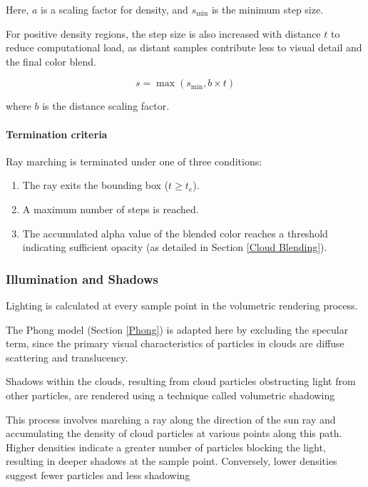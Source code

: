  Here, $a$ is a scaling factor for density, and $s_{\text{min}}$ is the minimum step size.

For positive density regions, the step size is also increased with distance $t$ to reduce computational load, as distant samples contribute less to visual detail and the final color blend.

\begin{equation}
     s = \max(s_{\text{min}}, b \times t)
\end{equation}

where $b$ is the distance scaling factor.

\paragraph{Termination criteria}

Ray marching is terminated under one of three conditions: 

\begin{enumerate}
    \item The ray exits the bounding box ($t\ge t_e$).
    \item A maximum number of steps is reached.
    \item The accumulated alpha value of the blended color reaches a threshold indicating sufficient opacity (as detailed in Section \ref{Cloud Blending}).
\end{enumerate}

\subsubsection{Illumination and Shadows}

Lighting is calculated at every sample point in the volumetric rendering process.

The Phong model (Section \ref{Phong}) is adapted here by excluding the specular term, since the primary visual characteristics of particles in clouds are diffuse scattering and translucency. 

Shadows within the clouds, resulting from cloud particles obstructing light from other particles, are rendered using a technique called volumetric shadowing

This process involves marching a ray along the direction of the sun ray and accumulating the density of cloud particles at various points along this path. Higher densities indicate a greater number of particles blocking the light, resulting in deeper shadows at the sample point. Conversely, lower densities suggest fewer particles and less shadowing

